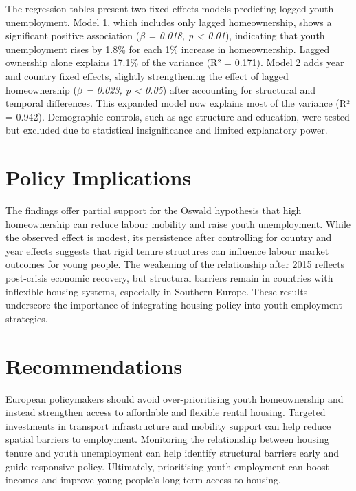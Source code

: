 \documentclass[11pt]{article}
\begin{document}
\begin{multicols}{2}
		\vspace{-1em}

		The regression tables present two fixed-effects models predicting logged youth unemployment. Model 1, which includes only lagged homeownership, shows a significant positive association (\textit{$\beta$ = 0.018, p < 0.01}), indicating that youth unemployment rises by 1.8\% for each 1\% increase in homeownership. Lagged ownership alone explains 17.1\% of the variance (R² = 0.171). Model 2 adds year and country fixed effects, slightly strengthening the effect of lagged homeownership (\textit{$\beta$ = 0.023, p < 0.05}) after accounting for structural and temporal differences. This expanded model now explains most of the variance (R² = 0.942). Demographic controls, such as age structure and education, were tested but excluded due to statistical insignificance and limited explanatory power.

		\vspace{-1em}

		\section*{Policy Implications}
		The findings offer partial support for the Oswald hypothesis that high homeownership can reduce labour mobility and raise youth unemployment. While the observed effect is modest, its persistence after controlling for country and year effects suggests that rigid tenure structures can influence labour market outcomes for young people. The weakening of the relationship after 2015 reflects post-crisis economic recovery, but structural barriers remain in countries with inflexible housing systems, especially in Southern Europe. These results underscore the importance of integrating housing policy into youth employment strategies.
		
		\vspace{-1em}
		
		\section*{Recommendations}
		European policymakers should avoid over-prioritising youth homeownership and instead strengthen access to affordable and flexible rental housing. Targeted investments in transport infrastructure and mobility support can help reduce spatial barriers to employment. Monitoring the relationship between housing tenure and youth unemployment can help identify structural barriers early and guide responsive policy. Ultimately, prioritising youth employment can boost incomes and improve young people's long-term access to housing.
		

\end{multicols}
\end{document}
